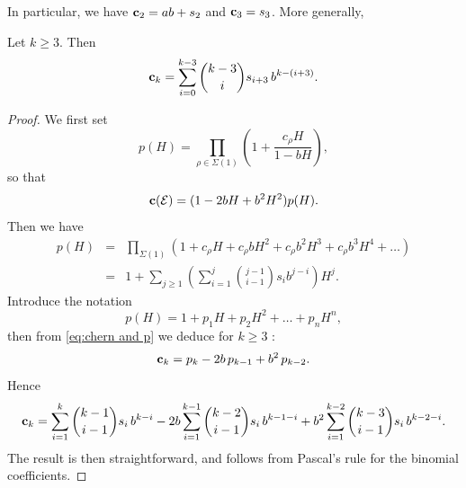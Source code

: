 \documentclass[a4paper,10pt]{amsart}
\theoremstyle{plain}{
    \newtheorem{theorem}{Theorem}[section]
    \newtheorem{lemma}[theorem]{Lemma}
    \newtheorem{corollary}[theorem]{Corollary}
    \newtheorem{proposition}[theorem]{Proposition}
    \newtheorem{conjecture}[theorem]{Conjecture}
}
\theoremstyle{definition}{
    \newtheorem{definition}[theorem]{Definition}
    \newtheorem{defn-thm}[theorem]{Definition-Theorem}
    \newtheorem{example}[theorem]{Example}
    \newtheorem{notation}[theorem]{Notation}
}
\theoremstyle{remark}{
    \newtheorem{remark}[theorem]{Remark}
    \newtheorem{problem}[theorem]{Problem}
    \newtheorem{question}[theorem]{Question}
}
\def\uc{{\bf c}}
\def\cE{\mathcal{E}}
\begin{document}
In particular, we have $\uc_2=ab+s_2$ and $\uc_3=s_3$. More generally,
\begin{lemma}
 \label{lem:chern classes general formula}
 Let $k\geq 3$. Then
 \begin{equation}
  \label{eq:chern classes general}
 \uc_k=\sum_{i=0}^{k-3} \binom{k-3}{i} s_{i+3}\,b^{k-(i+3)}.
 \end{equation}

\end{lemma}
\begin{proof}
 We first set 
 $$
 p(H)=\prod_{\rho\in\Sigma(1)}\left(1+ \frac{c_\rho H}{1-bH}\right),
 $$
 so that 
 \begin{equation}
  \label{eq:chern and p}
 \uc(\cE)=(1-2bH+b^2H^2)p(H).
 \end{equation}
 Then we have
 $$
 \begin{array}{ccc}
 p(H) & = & \displaystyle\prod_{\Sigma(1)}(1+c_\rho H+c_\rho b H^2 +c_\rho b^2 H^3 + c_\rho b^3 H^4+ \ldots) \\
      & = &\displaystyle 1 + \sum_{j \geq 1 } \left(\sum_{i=1}^j \binom{j-1}{i-1}s_ib^{j-i} \right) H^j.
 \end{array}
$$
Introduce the notation 
$$
p(H)=1+p_1 H +p_2H^2+\ldots +p_n H^n,
$$
then from \eqref{eq:chern and p} we deduce for $k\geq 3$ :
$$
\uc_k=p_k-2b\,p_{k-1}+b^2\,p_{k-2}.
$$
Hence 
$$
\uc_k=\sum_{i=1}^k \binom{k-1}{i-1}s_i\,b^{k-i}-2b\sum_{i=1}^{k-1}\binom{k-2}{i-1}s_i\,b^{k-1-i}+b^2\sum_{i=1}^{k-2}\binom{k-3}{i-1} s_i\, b^{k-2-i}.
$$
The result is then straightforward, and follows from Pascal's rule for the binomial coefficients.
\end{proof}
\end{document}
